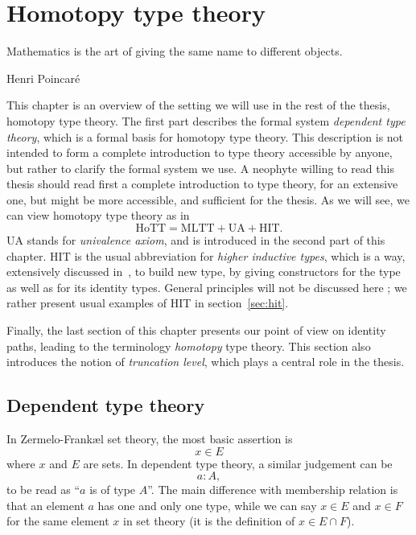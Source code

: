 \chapter{Homotopy type theory}
\label{chap:hott}

\epigraph{Mathematics is the art of giving the same name to different
  objects.}{Henri Poincaré}

This chapter is an overview of the setting we will use in the rest of
the thesis, homotopy type theory. The first part describes the formal
system {\em dependent type theory}, which is a formal basis for
homotopy type theory. This description is not intended to form a
complete introduction to type theory accessible by anyone, but rather
to clarify the formal system we use. A neophyte willing to read this
thesis should read first a complete introduction to type theory,
\cite{hofmann1997syntax} for an extensive one, but \cite{hottbook}
might be more accessible, and sufficient for the thesis. As we will
see, we can view homotopy type theory as in
\[ 
  \text{HoTT} = \text{MLTT} + \text{UA} + \text{HIT}.
\]
{UA} stands for {\em univalence axiom}, and is introduced in the
second part of this chapter.
{HIT} is the usual abbreviation for {\em higher inductive types},
which is a way, extensively discussed in~\cite{hottbook}, to build new
type, by giving constructors for the type as well as for its identity
types. General principles will not be discussed here ; we
rather present usual examples of {HIT} in section~\ref{sec:hit}.

Finally, the last section of this chapter presents our point of view
on identity paths, leading to the terminology {\em homotopy} type
theory. This section also introduces the notion of {\em truncation
  level}, which plays a central role in the thesis. 


\section{Dependent type theory}
\label{sec:mltt}

In Zermelo-Frank\ae l set theory, the most basic assertion is
\[ x\in E\]
where $x$ and $E$ are sets. 
In dependent type theory, a similar judgement can be
\[a:A, \]
to be read as ``$a$ is of type $A$''. The main difference with
membership relation is that an element $a$ has one and only one type,
while we can say $x\in E$ and $x\in F$ for the same element $x$ in set
theory (it is the definition of $x\in E\cap F$).

